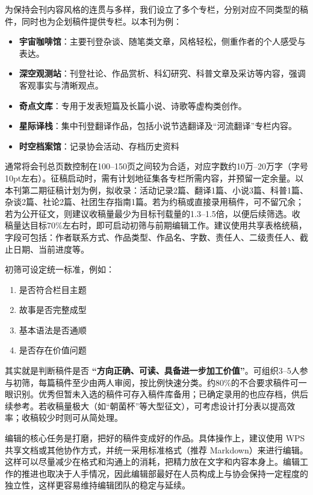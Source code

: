 为保持会刊内容风格的连贯与多样，我们设立了多个专栏，分别对应不同类型的稿件，同时也为企划稿件提供专栏。以本刊为例：

\begin{itemize}
\item
  \textbf{宇宙咖啡馆}：主要刊登杂谈、随笔类文章，风格轻松，侧重作者的个人感受与表达。
\item
  \textbf{深空观测站}：刊登社论、作品赏析、科幻研究、科普文章及采访等内容，强调客观事实与清晰观点。
\item
  \textbf{奇点文库}：专用于发表短篇及长篇小说、诗歌等虚构类创作。
\item
  \textbf{星际译栈}：集中刊登翻译作品，包括小说节选翻译及``河流翻译''专栏内容。
\item
  \textbf{时空档案馆}：记录协会活动、存档历史资料
\end{itemize}

通常将会刊总页数控制在100--150页之间较为合适，对应字数约10万--20万字（字号10pt左右）。征稿启动时，需有计划地征集各专栏所需内容，并预留一定余量。以本刊第二期征稿计划为例，拟收录：活动记录2篇、翻译1篇、小说3篇、科普1篇、杂谈2篇、社论2篇、社团生存指南1篇。若为约稿或直接录用稿件，可不留冗余；若为公开征文，则建议收稿量最少为目标刊载量的1.3--1.5倍，以便后续筛选。收稿量达目标70\%左右时，即可启动初筛与前期编辑工作。建议使用共享表格统稿，字段可包括：作者联系方式、作品类型、作品名、字数、责任人、二级责任人、截止日期、当前进度等。

初筛可设定统一标准，例如：

\begin{enumerate}
\def\labelenumi{\arabic{enumi}.}
\tightlist
\item
  是否符合栏目主题
\item
  故事是否完整成型
\item
  基本语法是否通顺
\item
  是否存在价值问题
\end{enumerate}

其实就是判断稿件是否
\textbf{``方向正确、可读、具备进一步加工价值''}。可组织3--5人参与初筛，每篇稿件至少由两人审阅，按比例快速分类。约80\%的不合要求稿件可一眼识别。优秀但暂未入选的稿件可存入稿件库备用；已确定录用的也应存档，供后续参考。若收稿量极大（如``朝菌杯''等大型征文），可考虑设计打分表以提高效率；收稿较少时则可从简处理。

编辑的核心任务是打磨，把好的稿件变成好的作品。具体操作上，建议使用 WPS
共享文档或其他协作方式，并统一采用标准格式（推荐
Markdown）来进行编辑。这样可以尽量减少在格式和沟通上的消耗，把精力放在文字和内容本身上。编辑工作的推进也取决于人手情况，因此编辑部最好在人员构成上与协会保持一定程度的独立性，这样更容易维持编辑团队的稳定与延续。

